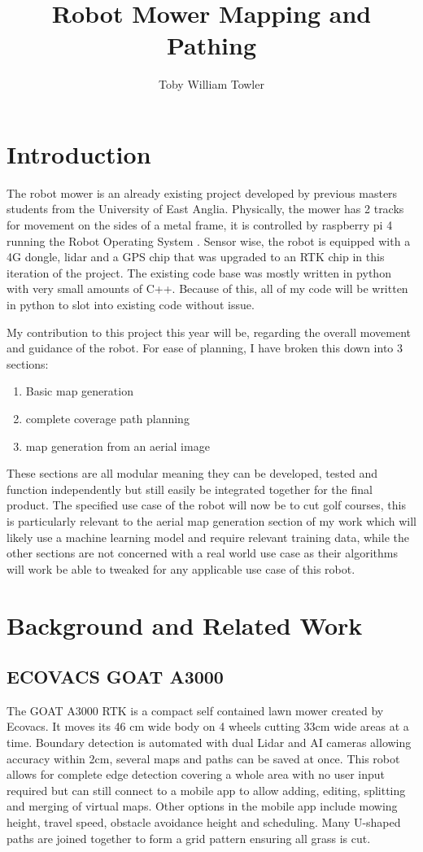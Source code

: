 \documentclass[final]{cmpreport_02}
\title{Robot Mower Mapping and Pathing}
\author{Toby William Towler}
\begin{document}
\section{Introduction}

The robot mower is an already existing project developed by previous masters students from the University of East Anglia.
Physically, the mower has 2 tracks for movement on the sides of a metal frame, it is controlled by raspberry pi 4 running the Robot Operating System \citep{ros}.
Sensor wise, the robot is equipped with a 4G dongle, lidar and a GPS chip that was upgraded to an RTK chip in this iteration of the project.
The existing code base was mostly written in python with very small amounts of C++.
Because of this, all of my code will be written in python to slot into existing code without issue.

My contribution to this project this year will be, regarding the overall movement and guidance of the robot.
For ease of planning, I have broken this down into 3 sections:
\begin{enumerate}
	\item Basic map generation
	\item complete coverage path planning
	\item map generation from an aerial image
\end{enumerate}

These sections are all modular meaning they can be developed, tested and function independently but still easily be integrated together for the final product.
The specified use case of the robot will now be to cut golf courses, this is particularly relevant to the aerial map generation section of my work which will likely use a machine learning model and require relevant training data, while the other sections are not concerned with a real world use case as their algorithms will work be able to tweaked for any applicable use case of this robot.


\section{Background and Related Work}

\subsection{ECOVACS GOAT A3000}
The GOAT A3000 RTK \citep{goata3000} is a compact self contained lawn mower created by Ecovacs.
It moves its 46 cm wide body on 4 wheels cutting 33cm wide areas at a time.
Boundary detection is automated with dual Lidar and AI cameras allowing accuracy within 2cm, several maps and paths can be saved at once.
This robot allows for complete edge detection covering a whole area with no user input required but can still connect to a mobile app to allow adding, editing, splitting and merging of virtual maps.
Other options in the mobile app include mowing height, travel speed, obstacle avoidance height and scheduling.
Many U-shaped paths are joined together to form a grid pattern ensuring all grass is cut.
\end{document}
